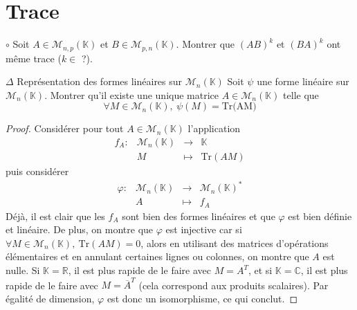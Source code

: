\documentclass[french,a4paper]{article}
\newcommand{\R}{\mathbb{R}}
\newcommand{\C}{\mathbb{C}}
\newcommand{\K}{\mathbb{K}}
\newcommand{\st}{^*}
\newcommand{\Tr}{\text{Tr}}
\theoremstyle{plain}
\theoremstyle{definition}
\theoremstyle{remark}
\begin{document}
\section{Trace}

\begin{ex}{$\circ$}
	Soit $A\in\mathcal{M}_{n,p}(\K)$ et $B\in\mathcal{M}_{p,n}(\K)$. Montrer que $(AB)^k$ et $(BA)^k$ ont même trace ($k\in$ ?).
\end{ex}

\begin{ex}{$\Delta$ Représentation des formes linéaires sur $\mathcal{M}_n(\K)$}
	Soit $\psi$ une forme linéaire sur $\mathcal{M}_n(\K)$. Montrer qu'il existe une unique matrice $A\in\mathcal{M}_n(\K)$ telle que $$\forall M\in\mathcal{M}_n(\K),\ \psi(M)=\text{Tr(AM)}$$
\end{ex}
\begin{proof}
	Considérer pour tout $A\in\mathcal{M}_n(\K)$ l'application $$\begin{array}{lrcl}
		f_A:&\mathcal{M}_n(\K)&\longrightarrow&\K \\
		&M&\longmapsto&\Tr(AM)
	\end{array}$$ puis considérer $$\begin{array}{lrcl}
		\varphi:&\mathcal{M}_n(\K)&\longrightarrow&\mathcal{M}_n(\K)\st\\
		&A&\longmapsto&f_A
	\end{array}$$ Déjà, il est clair que les $f_A$ sont bien des formes linéaires et que $\varphi$ est bien définie et linéaire. De plus, on montre que $\varphi$ est injective car si $\forall M\in\mathcal{M}_n(\K),\ \Tr(AM)=0$, alors en utilisant des matrices d'opérations élémentaires et en annulant certaines lignes ou colonnes, on montre que $A$ est nulle. Si $\K=\R$, il est plus rapide de le faire avec $M=A^T$, et si $\K=\C$, il est plus rapide de le faire avec $M=\overline{A}^T$ (cela correspond aux produits scalaires). Par égalité de dimension, $\varphi$ est donc un isomorphisme, ce qui conclut.
\end{proof}
\end{document}
